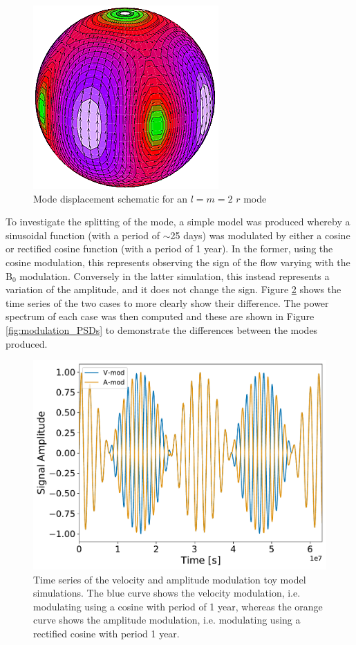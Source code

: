\begin{figure}[!ht]
	\centering
	\includegraphics[scale=0.7]{l2m2.png}
	\caption{Mode displacement schematic for an $l=m=2$ $r$ mode \citep{strohmayer_neutron_2014}}  \label{fig:l2m2}
\end{figure}

To investigate the splitting of the mode, a simple model was produced whereby a sinusoidal function (with a period of $\sim$25 days) was modulated by either a cosine or rectified cosine function (with a period of 1 year). In the former, using the cosine modulation, this represents observing the sign of the flow varying with the B$_0$ modulation. Conversely in the latter simulation, this instead represents a variation of the amplitude, and it does not change the sign. Figure \ref{fig:modulation} shows the time series of the two cases to more clearly show their difference. The power spectrum of each case was then computed and these are shown in Figure \ref{fig:modulation_PSDs} to demonstrate the differences between the modes produced.

\begin{figure}[!ht]
	\centering
	\includegraphics[width=0.65\columnwidth]{modulation_plot.pdf}
	\caption{Time series of the velocity and amplitude modulation toy model simulations. The blue curve shows the velocity modulation, i.e. modulating using a cosine with period of 1 year, whereas the orange curve shows the amplitude modulation, i.e. modulating using a rectified cosine with period 1 year.}  \label{fig:modulation}
\end{figure}

